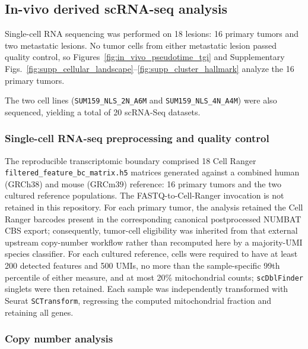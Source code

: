 \documentclass[11pt,notitlepage]{article}
\begin{document}
\subsection{In-vivo derived scRNA-seq analysis}

Single-cell RNA sequencing was performed on 18 lesions: 16 primary tumors and two metastatic lesions. No tumor cells from either metastatic lesion passed quality control, so Figures~\ref{fig:in_vivo_pseudotime_tgi} and Supplementary Figs.~\ref{fig:supp_cellular_landscape}--\ref{fig:supp_cluster_hallmark} analyze the 16 primary tumors.

The two cell lines (\texttt{SUM159\_NLS\_2N\_A6M} and \texttt{SUM159\_NLS\_4N\_A4M}) were also sequenced, yielding a total of 20 scRNA-Seq datasets.


\subsubsection{Single-cell RNA-seq preprocessing and quality control}
The reproducible transcriptomic boundary comprised 18 Cell Ranger \texttt{filtered\_feature\_bc\_matrix.h5} matrices generated against a combined human (GRCh38) and mouse (GRCm39) reference: 16 primary tumors and the two cultured reference populations. The FASTQ-to-Cell-Ranger invocation is not retained in this repository. For each primary tumor, the analysis retained the Cell Ranger barcodes present in the corresponding canonical postprocessed NUMBAT CBS export; consequently, tumor-cell eligibility was inherited from that external upstream copy-number workflow rather than recomputed here by a majority-UMI species classifier. For each cultured reference, cells were required to have at least 200 detected features and 500 UMIs, no more than the sample-specific 99th percentile of either measure, and at most 20\% mitochondrial counts; \texttt{scDblFinder} singlets were then retained. Each sample was independently transformed with Seurat \texttt{SCTransform}, regressing the computed mitochondrial fraction and retaining all genes.

\subsubsection{Copy number analysis}
\end{document}
